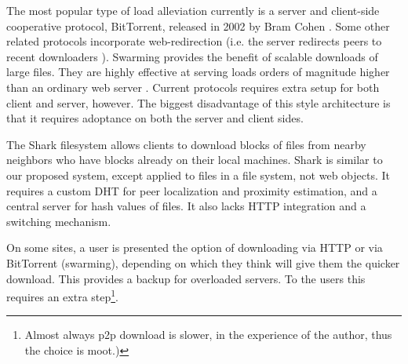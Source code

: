 The most popular type of load alleviation currently is a server and client-side cooperative protocol, BitTorrent, released in 2002 by Bram Cohen \cite{cohen}.
Some other related protocols incorporate web-redirection (i.e. the server redirects peers to recent downloaders \cite{overhaul, webtorrent, onion, zappala, cohen,
slurpie, mutualcast, fastreplica, avalanche, bullet_prime, onion}).  
Swarming provides the benefit of scalable downloads of large files.
They are highly effective at serving loads orders of magnitude higher than an ordinary web server \cite{zappala}. 
Current protocols requires extra setup for both client and server, however.
The biggest disadvantage of this style architecture is that it requires adoptance on both the server and client sides.

The Shark \cite{shark} filesystem allows clients to download blocks of files from nearby neighbors who have blocks already on their local machines.  
Shark is similar to our proposed system, except applied to files in a file system, not web objects.  
It requires a custom DHT for peer localization and proximity estimation, and a central server for hash values of files.  
It also lacks HTTP integration and a switching mechanism.

On some sites, a user is presented the option of downloading via HTTP or via BitTorrent (swarming), depending on which they think will give them the 
quicker download.  This provides a backup for overloaded servers.  To the users this requires an extra step\footnote{Almost always p2p download is slower, in the experience of the author, thus the choice is moot.)}. 

